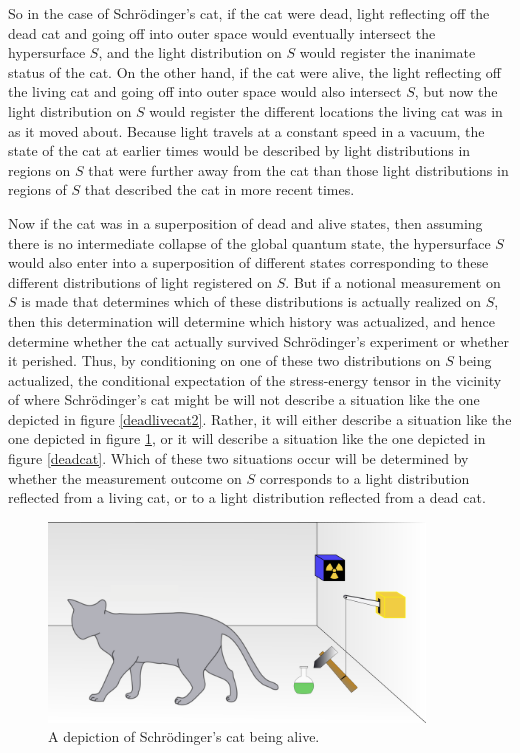 So in the case of Schr\"{o}dinger's cat, if the cat were dead,  light reflecting off the dead cat and going off into outer space would eventually intersect the hypersurface $S$, and the light distribution on $S$ would register the inanimate status of the cat. On the other hand, if the cat were alive, the light reflecting off the living cat and going off into outer space would also intersect $S$, but now the light distribution on $S$ would register the different locations the living cat was in as it moved about. Because light travels at a constant speed in a vacuum, the state of the cat at earlier times would be described by light distributions in regions on $S$ that were further away from the cat than those light distributions in regions of $S$ that described the cat in more recent times. 

Now if the cat was in a superposition of dead and alive states, then assuming there is no intermediate collapse of the global quantum state,  the hypersurface $S$ would also enter into a superposition of different states corresponding to these different distributions of light registered on $S$. But if a notional measurement on $S$ is made that determines which of these distributions is actually realized on $S$, then this determination will determine which history was actualized, and hence determine whether the cat actually survived Schr\"{o}dinger's experiment or whether it perished.   Thus, by conditioning on one of these two distributions on $S$ being actualized, the conditional expectation of the stress-energy tensor in the vicinity of where Schr\"{o}dinger's cat might be 
will not describe a situation like the one depicted in figure \ref{deadlivecat2}.   Rather, it will either describe a situation like the one depicted in figure \ref{livecat}, or it will describe a situation like the one depicted in figure \ref{deadcat}. Which of these two situations occur will be determined by whether the measurement outcome on $S$ corresponds to a light distribution reflected from a living cat, or to a light distribution reflected from a dead cat. 
\begin{figure}[ht!]
  \captionsetup{justification=justified}
  \centering
  \includegraphics[width=100mm]{Chapter03/Schrodingers_livecat.png}
  \caption[Depiction of Schr\"{o}dinger's living cat]{A depiction of Schr\"{o}dinger's cat being alive.\protect\footnotemark}
  \label{livecat}
  \end{figure}


